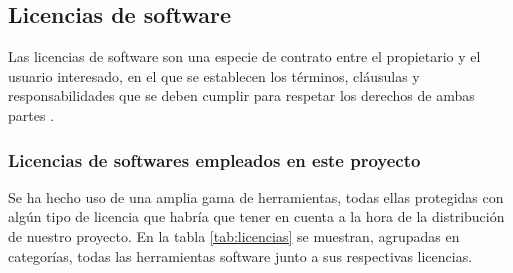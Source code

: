 \subsection{Licencias de software}
Las licencias de software son una especie de contrato entre el propietario y el usuario interesado, en el que se establecen los términos, cláusulas y responsabilidades que se deben cumplir para respetar los derechos de ambas partes \cite{TiposdelLicencias:online}.

\subsubsection{Licencias de softwares empleados en este proyecto}
Se ha hecho uso de una amplia gama de herramientas, todas ellas protegidas con algún tipo de licencia que habría que tener en cuenta a la hora de la distribución de nuestro proyecto. En la tabla \ref{tab:licencias} se muestran, agrupadas en categorías, todas las herramientas software junto a sus respectivas licencias.

